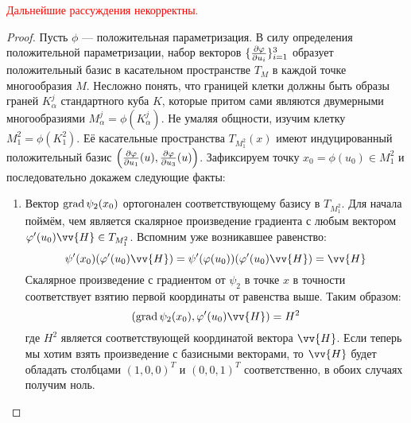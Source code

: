 \textcolor{red}{Дальнейшие рассуждения некорректны.}

\begin{proof}
	Пусть $\phi$ --- положительная параметризация. В силу определения положительной параметризации, набор векторов $\{\frac{\partial \varphi}{\partial u_i}\}_{i = 1}^3$ образует положительный базис в касательном пространстве $T_M$ в каждой точке многообразия $M$. Несложно понять, что границей клетки должны быть образы граней $K_\alpha^j$ стандартного куба $K$, которые притом сами являются двумерными многообразиями $M_\alpha^j = \phi(K_\alpha^j)$. Не умаляя общности, изучим клетку $M_1^2 = \phi(K_1^2)$. Её касательные пространства $T_{M_1^2}(x)$ имеют индуцированный положительный базис $\left(\frac{\partial \varphi}{\partial u_1}(u), \frac{\partial \varphi}{\partial u_3}(u)\right)$. Зафиксируем точку $x_0 = \phi(u_0) \in M_1^2$ и последовательно докажем следующие факты:
	\begin{enumerate}
		\item Вектор $\operatorname{grad} \psi_2(x_0)$ ортогонален соответствующему базису в $T_{M_1^2}$. Для начала поймём, чем является скалярное произведение градиента с любым вектором $\phi'(u_0)\vv{H} \in T_{M_1^2}$. Вспомним уже возникавшее равенство:
		\[
		\psi'(x_0)(\phi'(u_0)\vv{H}) = \psi'(\phi(u_0))(\phi'(u_0)\vv{H}) = \vv{H}
		\]
		Скалярное произведение с градиентом от $\psi_2$ в точке $x$ в точности соответствует взятию первой координаты от равенства выше. Таким образом:
		\[
		(\grad \psi_2(x_0), \phi'(u_0)\vv{H}) = H^2
		\]
		где $H^2$ является соответствующей координатой вектора $\vv{H}$. Если теперь мы хотим взять произведение с базисными векторами, то $\vv{H}$ будет обладать столбцами $(1, 0, 0)^T$ и $(0, 0, 1)^T$ соответственно, в обоих случаях получим ноль.
		

\end{enumerate}
\end{proof}
